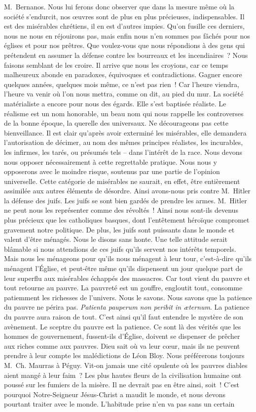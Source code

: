 \documentclass[french,twoside]{book} %
\begin{document}
M. Bernanos. Nous lui ferons donc observer que dans la mesure même où la société s’endurcit, nos œuvres sont de plus en plus précieuses, indispensables. Il est des misérables chrétiens, il en est d’autres impies. Qu’on fusille ces derniers, nous ne nous en réjouirons pas, mais enfin nous n’en sommes pas fâchés pour nos églises et pour nos prêtres. Que voulez-vous que nous répondions à des gens qui prétendent en assumer la défense contre les bourreaux et les incendiaires ? Nous faisons semblant de les croire. Il arrive que nous les croyions, car ce temps malheureux abonde en paradoxes, équivoques et contradictions. Gagner encore quelques années, quelques mois même, ce n’est pas rien ! Car l’heure viendra, l’heure va venir où l’on nous mettra, comme on dit, au pied du mur. La société matérialiste a encore pour nous des égards. Elle s’est baptisée réaliste. Le réalisme est un nom honorable, un beau nom qui nous rappelle les controverses de la bonne époque, la querelle des universaux. Ne décourageons pas cette bienveillance. Il est clair qu’après avoir exterminé les misérables, elle demandera l’autorisation de décimer, au nom des mêmes principes réalistes, les incurables, les infirmes, les tarés, ou présumés tels – dans l’intérêt de la race. Nous devons nous opposer nécessairement à cette regrettable pratique. Nous nous y opposerons avec le moindre risque, soutenus par une partie de l’opinion universelle. Cette catégorie de misérables ne saurait, en effet, être entièrement assimilée aux autres éléments de désordre. Ainsi avons-nous pris contre M. Hitler la défense des juifs. Les juifs se sont bien gardés de prendre les armes. M. Hitler ne peut nous les représenter comme des révoltés ! Ainsi nous sont-ils devenus plus précieux que les catholiques basques, dont l’entêtement héroïque compromet gravement notre politique. De plus, les juifs sont puissants dans le monde et valent d’être ménagés. Nous le disons sans honte. Une telle attitude serait blâmable si nous attendions de ces juifs qu’ils servent nos intérêts temporels. Mais nous les ménageons pour qu’ils nous ménagent à leur tour, c’est-à-dire qu’ils ménagent l’Église, et peut-être même qu’ils dispensent un jour quelque part de leur superflu aux misérables échappés des massacres. Car tout vient du pauvre et tout retourne au pauvre. La pauvreté est un gouffre, engloutit tout, consomme patiemment les richesses de l’univers. Nous le savons. Nous savons que la patience du pauvre ne périra pas. \emph{Patienta pauperum non peribit in æternum}. La patience du pauvre aura raison de tout. C’est ainsi qu’il faut entendre le mystère de son avènement. Le sceptre du pauvre est la patience. Ce sont là des vérités que les hommes de gouvernement, fussent-ils d’Église, doivent se dispenser de prêcher aux riches comme aux pauvres. Dieu sait où va leur cœur, mais ils ne peuvent prendre à leur compte les malédictions de Léon Bloy. Nous préférerons toujours M. Ch. Maurras à Péguy. Vit-on jamais une cité opulente où les pauvres diables aient mangé à leur faim ? Les plus hautes fleurs de la civilisation humaine ont poussé sur les fumiers de la misère. Il ne devrait pas en être ainsi, soit ! C’est pourquoi Notre-Seigneur Jésus-Christ a maudit le monde, et nous devons pourtant traiter avec le monde. L’habitude prise n’en va pas sans un certain 
\end{document}
